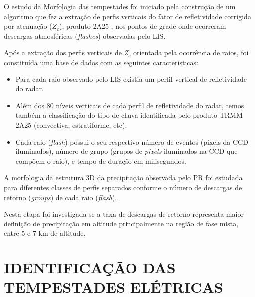 O estudo da Morfologia das tempestades foi iniciado pela construção de um algoritmo que fez a extração de perfis verticais do fator de refletividade corrigida por atenuação ($Z_c$),  produto 2A25 \cite{iguchi2009}, nos pontos de grade onde ocorreram descargas atmosféricas (\textit{flashes}) observadas pelo LIS.


Após a extração dos perfis verticais de $Z_c$ orientada pela ocorrência de raios, foi constituída uma base de dados com as seguintes características:

\begin{itemize}
\item Para cada raio observado pelo LIS existia um perfil vertical de refletividade do radar.
\item Além dos 80 níveis verticais de cada perfil de refletividade do radar, temos também a classificação do tipo de chuva identificada pelo produto TRMM 2A25 (convectiva, estratiforme, etc).
\item Cada raio (\textit{flash}) possui o seu respectivo número de eventos (pixels da CCD iluminados), número de grupo (grupos de \textit{pixels} iluminados na CCD que compõem o raio), e tempo de duração em milisegundos. 
\end{itemize}

A morfologia da estrutura 3D da precipitação observada pelo PR foi estudada para diferentes classes de perfis separados conforme o número de descargas de retorno (\textit{groups}) de cada raio (\textit{flash}). 

Nesta etapa foi investigada se a taxa de descargas de retorno representa maior definição de precipitação em altitude principalmente na região de fase mista, entre 5 e 7 km de altitude. 

\section{IDENTIFICAÇÃO DAS TEMPESTADES ELÉTRICAS}


